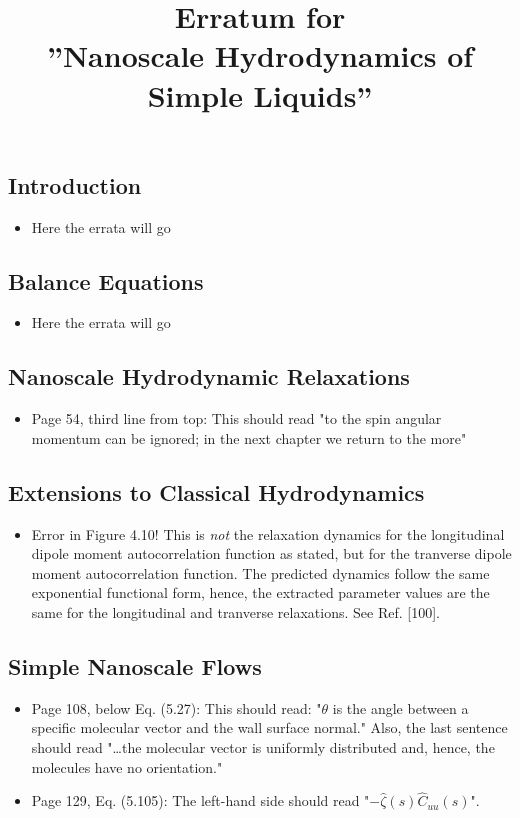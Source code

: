 \documentclass{article}
\title{Erratum for \\ ''Nanoscale Hydrodynamics of Simple Liquids''}
\date{}
\begin{document}
\maketitle

\subsection*{Introduction}
\begin{itemize}
\item Here the errata will go
\end{itemize}

\subsection*{Balance Equations}
\begin{itemize}
\item Here the errata will go
\end{itemize}

\subsection*{Nanoscale Hydrodynamic Relaxations}
\begin{itemize}
\item Page 54, third line from top: This should read "to the spin angular momentum can be ignored; in the next chapter we return to the more"
\end{itemize}

\subsection*{Extensions to Classical Hydrodynamics}
\begin{itemize}
	\item Error in Figure 4.10! This is \emph{not} the relaxation dynamics for the longitudinal
		dipole moment autocorrelation function as stated, but for the 
		tranverse dipole moment autocorrelation function. The predicted dynamics 
		follow the same exponential functional form, hence, the extracted parameter 
		values are the same for the longitudinal and tranverse relaxations. See Ref. [100].
\end{itemize}

\subsection*{Simple Nanoscale Flows}
\begin{itemize}
\item Page 108, below Eq. (5.27): This should read: "$\theta$ is the angle between a specific molecular vector 
and the wall surface normal." Also, the last sentence should read "\ldots the molecular vector is uniformly distributed and, hence, 
the molecules have no orientation."  
\item Page 129, Eq. (5.105): The left-hand side should read "$-\widehat{\zeta}(s)\widehat{C}_{uu}(s)$".
\end{itemize}
\end{document}
